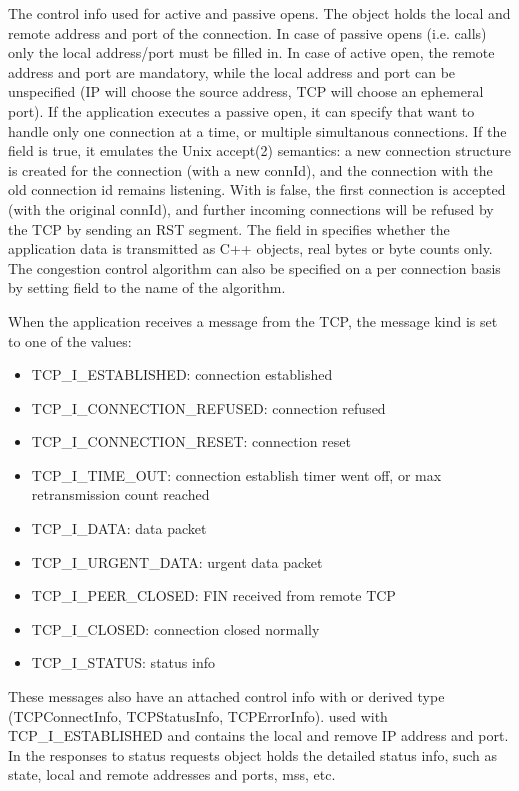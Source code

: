 The  control info used for active and passive opens.
The object holds the local and remote address and port of the connection.
In case of passive opens (i.e.  calls) only the local
address/port must be filled in. In case of active open, the remote
address and port are mandatory, while the local address and port can be
unspecified (IP will choose the source address, TCP will choose an ephemeral port).
If the application executes a passive open, it can specify that want to handle
only one connection at a time, or multiple simultanous connections. If the
 field is true, it emulates the Unix accept(2) semantics: a new
connection structure is created for the connection (with a new connId),
and the connection with the old connection id remains listening.
With  is false, the first connection is accepted (with the original connId),
and further incoming connections will be refused by the TCP by sending an RST segment.
The  field in  specifies
whether the application data is transmitted as C++ objects, real bytes or byte
counts only. The congestion control algorithm can also be specified
on a per connection basis by setting  field to the
name of the algorithm.


When the application receives a message from the TCP, the message kind is
set to one of the  values:
\begin{itemize}
  \item TCP\_I\_ESTABLISHED: connection established
  \item TCP\_I\_CONNECTION\_REFUSED: connection refused
  \item TCP\_I\_CONNECTION\_RESET: connection reset
  \item TCP\_I\_TIME\_OUT: connection establish timer went off, or max retransmission count reached
  \item TCP\_I\_DATA: data packet
  \item TCP\_I\_URGENT\_DATA: urgent data packet
  \item TCP\_I\_PEER\_CLOSED: FIN received from remote TCP
  \item TCP\_I\_CLOSED: connection closed normally
  \item TCP\_I\_STATUS: status info
\end{itemize}

These messages also have an attached control info with 
or derived type (TCPConnectInfo, TCPStatusInfo, TCPErrorInfo).
 used with TCP\_I\_ESTABLISHED and 
contains the local and remove IP address and port. In the responses
to status requests  object holds the detailed
status info, such as state, local and remote addresses and ports, mss, etc.

